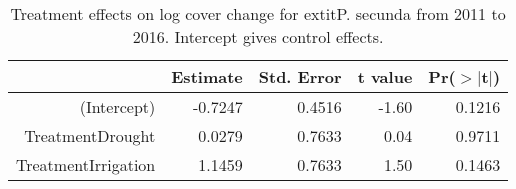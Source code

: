\begin{table}[ht]
\centering
\caption{Treatment effects on log cover change for 	extit{P. secunda} from 2011 to 2016. Intercept gives control effects.} 
\label{table:changePOSE}
\begin{tabular}{rrrrr}
  \hline
 & Estimate & Std. Error & t value & Pr($>$$|$t$|$) \\ 
  \hline
(Intercept) & -0.7247 & 0.4516 & -1.60 & 0.1216 \\ 
  TreatmentDrought & 0.0279 & 0.7633 & 0.04 & 0.9711 \\ 
  TreatmentIrrigation & 1.1459 & 0.7633 & 1.50 & 0.1463 \\ 
   \hline
\end{tabular}
\end{table}
